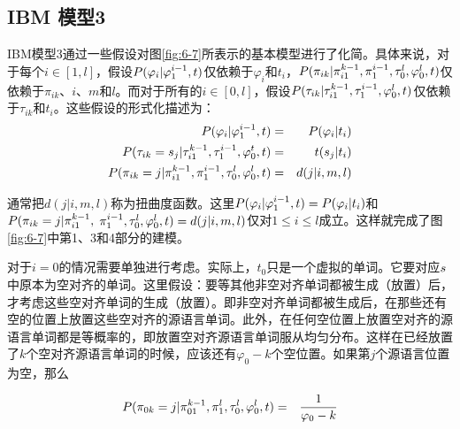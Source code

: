 
\subsection{IBM 模型3}

\parinterval IBM模型3通过一些假设对图\ref{fig:6-7}所表示的基本模型进行了化简。具体来说，对于每个$i\in[1,l]$，假设${P}(\varphi_i |\varphi_1^{i-1},{t})$仅依赖于$\varphi_i$和$t_i$，${P}(\pi_{ik}|\pi_{i1}^{k-1},\pi_1^{i-1},\tau_0^l,\varphi_0^l,{t})$仅依赖于$\pi_{ik}$、$i$、$m$和$l$。而对于所有的$i\in[0,l]$，假设${P}(\tau_{ik}|\tau_{i1}^{k-1},\tau_1^{i-1},\varphi_0^l,{t})$仅依赖于$\tau_{ik}$和$t_i$。这些假设的形式化描述为：
\vspace{-0.5em}
\begin{eqnarray}
{P}(\varphi_i|\varphi_1^{i-1},{t})                                                              & = &{{P}(\varphi_i|t_i)} \label{eq:6-10} \\
{P}(\tau_{ik} = s_j |\tau_{i1}^{k-1},\tau_{1}^{i-1},\varphi_0^t,{t})             & = & t(s_j|t_i) \label{eq:6-11} \\
{P}(\pi_{ik} = j |\pi_{i1}^{k-1},\pi_{1}^{i-1},\tau_{0}^{l},\varphi_{0}^{l},{t}) & = & d(j|i,m,l) \label{eq:6-12}
\end{eqnarray}

\parinterval 通常把$d(j|i,m,l)$称为扭曲度函数。这里${P}(\varphi_i|\varphi_1^{i-1},{t})={{P}(\varphi_i|t_i)}$和${{P}(\pi_{ik}=j|\pi_{i1}^{k-1},}$ $\pi_{1}^{i-1},\tau_0^l,\varphi_0^l,{t})=d(j|i,m,l)$仅对$1 \le i \le l$成立。这样就完成了图\ref{fig:6-7}中第1、3和4部分的建模。

\parinterval 对于$i=0$的情况需要单独进行考虑。实际上，$t_0$只是一个虚拟的单词。它要对应${s}$中原本为空对齐的单词。这里假设：要等其他非空对齐单词都被生成（放置）后，才考虑这些空对齐单词的生成（放置）。即非空对齐单词都被生成后，在那些还有空的位置上放置这些空对齐的源语言单词。此外，在任何空位置上放置空对齐的源语言单词都是等概率的，即放置空对齐源语言单词服从均匀分布。这样在已经放置了$k$个空对齐源语言单词的时候，应该还有$\varphi_0-k$个空位置。如果第$j$个源语言位置为空，那么

\begin{eqnarray}
{P}(\pi_{0k}=j|\pi_{01}^{k-1},\pi_1^l,\tau_0^l,\varphi_0^l,{t}) & = & \frac{1}{\varphi_0-k}
\label{eq:6-13}
\end{eqnarray}

